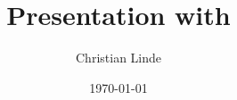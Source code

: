 
 \newcommand{\TITEL}{Presentation with \latex} 
 \title{\TITEL}
 \newcommand{\AuthorA}{Christian Linde}
 \newcommand{\AuthorB}{\AuthorA}
 \newcommand{\Author}{\AuthorA}
 \author{\Author}

 \date{\today} 

\newcommand{\para}{\parindent 0pt \parskip 12pt}
